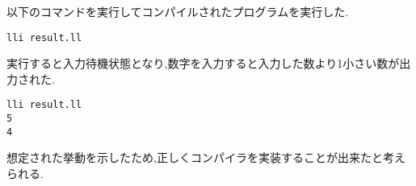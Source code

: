 \documentclass[main]{subfiles}
\begin{document}
以下のコマンドを実行してコンパイルされたプログラムを実行した.
\begin{oframed}
\begin{verbatim}
lli result.ll
\end{verbatim}
\end{oframed}
実行すると入力待機状態となり,数字を入力すると入力した数より1小さい数が出力された.
\begin{lstlisting}[caption=k4-1.pをコンパイルしたプログラムを実行]
lli result.ll
5
4
\end{lstlisting}
想定された挙動を示したため,正しくコンパイラを実装することが出来たと考えられる.
\end{document}
